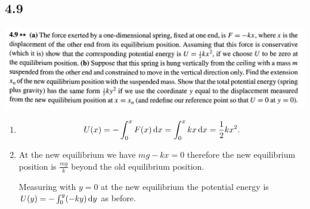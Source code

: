 \subsection{4.9}
\begin{mdframed}
  \includegraphics[width=400pt]{img/physics--classical-mechanics--taylor--q-4-9.png}
\end{mdframed}
\begin{enumerate}[label=(\alph*)]
\item
\begin{align*}
  U(x)
  = -\int_0^x F(x) \dx
  = \int_0^x kx \dx = \frac{1}{2}kx^2.
\end{align*}
\item At the new equilibrium we have $mg - kx = 0$ therefore the new equilibrium position is
  $\frac{mg}{k}$ beyond the old equilibrium position. \correct

  Measuring with $y = 0$ at the new equilibrium the potential energy is $U(y) = -\int_0^y (-ky) \dy$ as before.
\end{enumerate}

